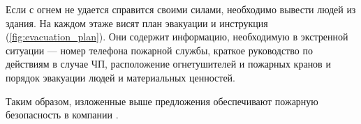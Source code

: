 Если с огнем не удается справится своими силами, необходимо вывести людей из здания. На каждом этаже висят план эвакуации и инструкция (\autoref{fig:evacuation_plan}). Они содержит информацию, необходимую в экстренной ситуации --- номер телефона пожарной службы, краткое руководство по действиям в случае ЧП, расположение огнетушителей и пожарных кранов и порядок эвакуации людей и материальных ценностей.

Таким образом, изложенные выше предложения обеспечивают пожарную безопасность в компании \yandexbel{}. \cite{ppb_by}

